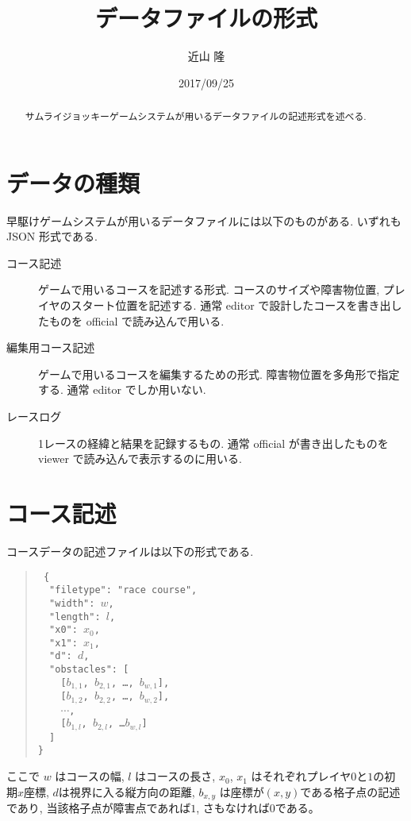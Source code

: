 \documentclass[11pt]{jarticle}
\title{{\gamename}データファイルの形式}
\author{近山 隆}
\date{2017/09/25}
\newcommand\gamename{サムライジョッキー}
\begin{document}
\maketitle
\begin{abstract}
{\gamename}ゲームシステムが用いるデータファイルの記述形式を述べる.
\end{abstract}

\section{データの種類}
早駆けゲームシステムが用いるデータファイルには以下のものがある.
いずれも JSON 形式である.
\begin{description}
\item[コース記述]
  ゲームで用いるコースを記述する形式.
  コースのサイズや障害物位置, プレイヤのスタート位置を記述する.
  通常 editor で設計したコースを書き出したものを official で読み込んで用いる.
\item[編集用コース記述]
  ゲームで用いるコースを編集するための形式.
  障害物位置を多角形で指定する.
  通常 editor でしか用いない.
\item[レースログ]
  1レースの経緯と結果を記録するもの.
  通常 official が書き出したものを viewer で読み込んで表示するのに用いる.
\end{description}

\section{コース記述}
\label{courseDescr}
コースデータの記述ファイルは以下の形式である.
\begin{quote}\tt
\{\\
~~"filetype": "race course",\\
~~"width": $w$,\\
~~"length": $l$,\\
~~"x0": $x_0$,\\
~~"x1": $x_1$,\\
~~"d": $d$,\\
~~"obstacles": [\\
~~~~[$b_{1,1}$, $b_{2,1}$, \ldots, $b_{w,1}$],\\
~~~~[$b_{1,2}$, $b_{2,2}$, \ldots, $b_{w,2}$],\\
~~~~$\cdots$,\\
~~~~[$b_{1,l}$, $b_{2,l}$, \ldots $b_{w,l}$]\\
~~]\\
\}
\end{quote}
ここで $w$ はコースの幅, $l$ はコースの長さ,
$x_0$, $x_1$ はそれぞれプレイヤ$0$と$1$の初期$x$座標,
$d$は視界に入る縦方向の距離,
$b_{x,y}$ は座標が$(x,y)$である格子点の記述であり, 
当該格子点が障害点であれば$1$, さもなければ$0$である。
\end{document}
